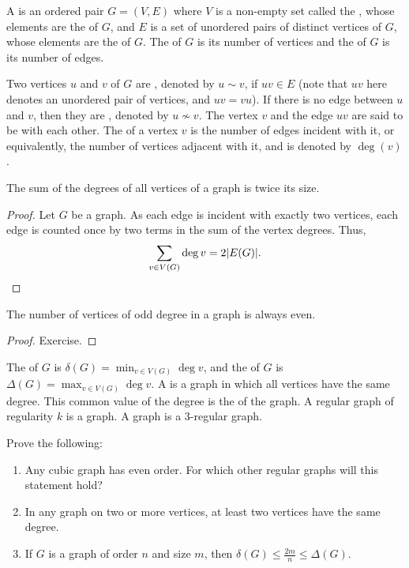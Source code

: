 A  is an ordered pair $G = (V, E)$ where $V$ is a non-empty set called the , whose elements are the  of $G$, and $E$ is a set of unordered pairs of distinct vertices of $G$, whose elements are the  of $G$. The  of $G$ is its number of vertices and the  of $G$ is its number of edges.

Two vertices $u$ and $v$ of $G$ are , denoted by $u \sim v$, if $uv \in E$ (note that $uv$ here denotes an unordered pair of vertices, and $uv = vu$). If there is no edge between $u$ and $v$, then they are , denoted by $u \nsim v$. The vertex $v$ and the edge $uv$ are said to be  with each other. The  of a vertex $v$ is the number of edges incident with it, or equivalently, the number of vertices adjacent with it, and is denoted by $\deg(v)$.

\begin{Lemma}
The sum of the degrees of all vertices of a graph is twice its size.
\end{Lemma}

\begin{proof}
Let $G$ be a graph. As each edge is incident with exactly two vertices, each edge is counted once by two terms in the sum of the vertex degrees. Thus,
\begin{equation*}
    \sum_{v \in V(G)}\deg v=2|E(G)|. \qedhere
\end{equation*}
\end{proof}

\begin{Corollary}
The number of vertices of odd degree in a graph is always even.
\end{Corollary}

\begin{proof}
Exercise.
\end{proof}

The  of $G$ is $\delta(G) = \min_{v \in V(G)} \deg v$, and the  of $G$ is $\Delta(G) = \max_{v \in V(G)} \deg v$. A  is a graph in which all vertices have the same degree. This common value of the degree is the  of the graph. A regular graph of regularity $k$ is a  graph. A  graph is a $3$-regular graph.

\begin{Exercise}
Prove the following:
\begin{enumerate}
\item Any cubic graph has even order. For which other regular graphs will this statement hold?
\item In any graph on two or more vertices, at least two vertices have the same degree.
\item If $G$ is a graph of order $n$ and size $m$, then $\delta(G) \le \frac{2m}{n} \le \Delta(G)$.
\end{enumerate}
\end{Exercise}

